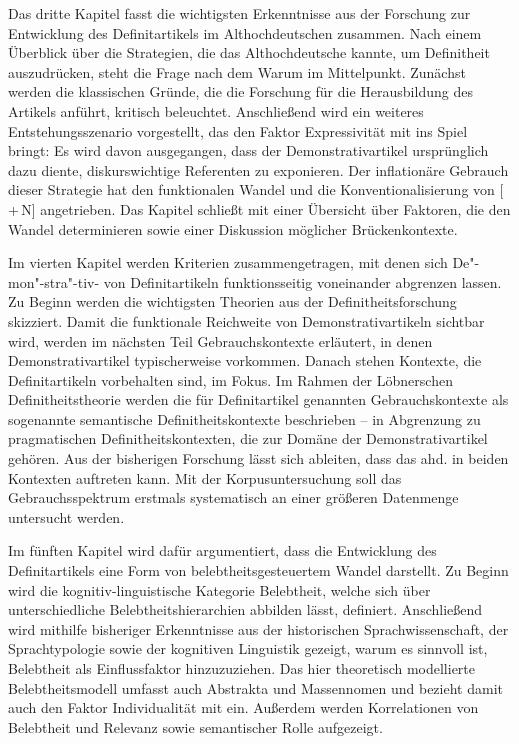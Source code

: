 Das dritte Kapitel fasst die wichtigsten Erkenntnisse aus der Forschung zur Entwicklung des Definitartikels im Althochdeutschen zusammen. Nach einem Überblick über die Strategien, die das Althochdeutsche kannte, um Definitheit auszudrücken, steht die Frage nach dem Warum im Mittelpunkt. Zunächst werden die klassischen Gründe, die die Forschung für die Herausbildung des Artikels anführt, kritisch beleuchtet. Anschließend wird ein weiteres Entstehungsszenario vorgestellt, das den Faktor Expressivität mit ins Spiel bringt: Es wird davon ausgegangen, dass der Demonstrativartikel ursprünglich dazu diente, diskurswichtige Referenten zu exponieren. Der inflationäre Gebrauch dieser Strategie hat den funktionalen Wandel und die Konventionalisierung von [\,+\,N] angetrieben. Das Kapitel schließt mit einer Übersicht über Faktoren, die den Wandel determinieren sowie einer Diskussion möglicher Brückenkontexte. 

Im vierten Kapitel werden Kriterien zusammengetragen, mit denen sich De"-mon"-stra"-tiv- von Definitartikeln funktionsseitig voneinander abgrenzen lassen. Zu Beginn werden die wichtigsten Theorien aus der Definitheitsforschung  skizziert. Damit die funktionale Reichweite von Demonstrativartikeln sichtbar wird, werden im nächsten Teil Gebrauchskontexte erläutert, in denen Demonstrativartikel typischerweise vorkommen. Danach stehen Kontexte, die  Definitartikeln vorbehalten sind, im Fokus. 
Im Rahmen der Löbnerschen Definitheitstheorie \parencite{Lobner1985}  werden die für Definitartikel genannten Gebrauchskontexte als sogenannte semantische Definitheitskontexte beschrieben -- in Abgrenzung zu  pragmatischen Definitheitskontexten, die zur Domäne der Demonstrativartikel gehören. Aus der bisherigen Forschung lässt sich ableiten, dass das ahd.  in beiden Kontexten auftreten kann. Mit der Korpusuntersuchung soll das Gebrauchsspektrum erstmals systematisch an einer größeren Datenmenge untersucht werden. 

Im fünften Kapitel wird dafür argumentiert, dass die Entwicklung des Definitartikels eine Form von belebtheitsgesteuertem Wandel darstellt. Zu Beginn wird die kognitiv-linguistische Kategorie Belebtheit, welche sich über unterschiedliche Belebtheitshierarchien abbilden lässt, definiert. Anschließend wird mithilfe bisheriger Erkenntnisse aus der historischen Sprachwissenschaft, der Sprachtypologie sowie der kognitiven Linguistik gezeigt, warum es sinnvoll ist, Belebtheit als Einflussfaktor hinzuzuziehen. Das hier theoretisch modellierte Belebtheitsmodell umfasst auch Abstrakta und Massennomen und bezieht damit auch den Faktor Individualität mit ein. Außerdem werden Korrelationen von Belebtheit und Relevanz sowie semantischer Rolle aufgezeigt.


